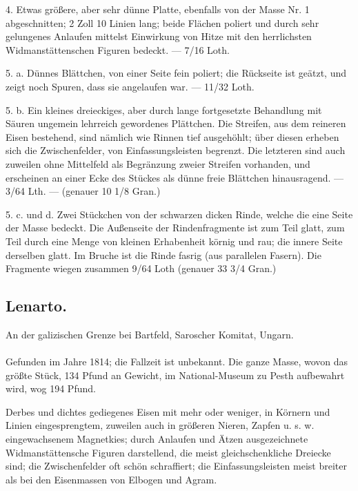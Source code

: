 \documentclass[a4paper, 11pt, oneside, polutonikogreek, german]{article}
\begin{document}
4. Etwas größere, aber sehr dünne Platte, ebenfalls von der Masse Nr. 1 abgeschnitten; 2 Zoll 10 Linien lang; beide Flächen poliert und durch sehr gelungenes Anlaufen mittelst Einwirkung von Hitze mit den herrlichsten Widmanstättenschen Figuren bedeckt. — 7/16 Loth.

5. a. Dünnes Blättchen, von einer Seite fein poliert; die Rückseite ist geätzt, und zeigt noch Spuren, dass sie angelaufen war. — 11/32 Loth.

5. b. Ein kleines dreieckiges, aber durch lange fortgesetzte Behandlung mit Säuren ungemein lehrreich gewordenes Plättchen. Die Streifen, aus dem reineren Eisen bestehend, sind nämlich wie Rinnen tief ausgehöhlt; über diesen erheben sich die Zwischenfelder, von Einfassungsleisten begrenzt. Die letzteren sind auch zuweilen ohne Mittelfeld als Begränzung zweier Streifen vorhanden, und erscheinen an einer Ecke des Stückes als dünne freie Blättchen hinausragend. — 3/64 Lth. — (genauer 10 1/8 Gran.)

5. c. und d. Zwei Stückchen von der schwarzen dicken Rinde, welche die eine Seite der Masse bedeckt. Die Außenseite der Rindenfragmente ist zum Teil glatt, zum Teil durch eine Menge von kleinen Erhabenheit körnig und rau; die innere Seite derselben glatt. Im Bruche ist die Rinde fasrig (aus parallelen Fasern). Die Fragmente wiegen zusammen 9/64 Loth (genauer 33 3/4 Gran.)
\subsection{Lenarto.}
\begin{center}
\small
An der galizischen Grenze bei Bartfeld, Saroscher Komitat, Ungarn.
\end{center}
\paragraph{}
Gefunden im Jahre 1814; die Fallzeit ist unbekannt. Die ganze Masse, wovon das größte Stück, 134 Pfund an Gewicht, im National-Museum zu Pesth aufbewahrt wird, wog 194 Pfund.

Derbes und dichtes gediegenes Eisen mit mehr oder weniger, in Körnern und Linien eingesprengtem, zuweilen auch in größeren Nieren, Zapfen u. s. w. eingewachsenem Magnetkies; durch Anlaufen und Ätzen ausgezeichnete Widmanstättensche Figuren darstellend, die meist gleichschenkliche Dreiecke sind; die Zwischenfelder oft schön schraffiert; die Einfassungsleisten meist breiter als bei den Eisenmassen von Elbogen und Agram.
\end{document}

